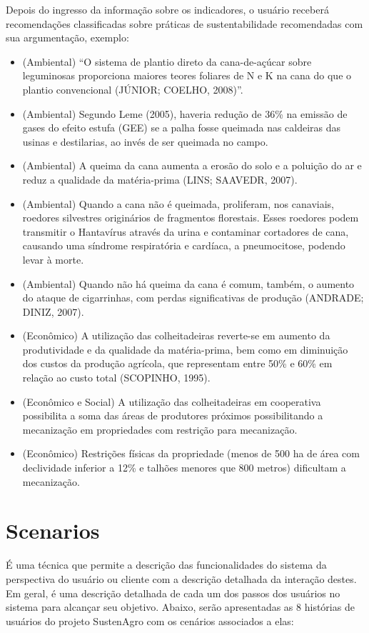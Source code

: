 Depois do ingresso da informação sobre os indicadores, o usuário receberá
recomendações classificadas sobre práticas de sustentabilidade recomendadas
com sua argumentação, exemplo: 
\begin{itemize}
\item (Ambiental) “O sistema de plantio direto da cana-de-açúcar sobre leguminosas
proporciona maiores teores foliares de N e K na cana do que o plantio
convencional (JÚNIOR; COELHO, 2008)”.
\item (Ambiental) Segundo Leme (2005), haveria redução de 36\% na emissão
de gases do efeito estufa (GEE) se a palha fosse queimada nas caldeiras
das usinas e destilarias, ao invés de ser queimada no campo.
\item (Ambiental) A queima da cana aumenta a erosão do solo e a poluição
do ar e reduz a qualidade da matéria-prima (LINS; SAAVEDR, 2007). 
\item (Ambiental) Quando a cana não é queimada, proliferam, nos canaviais,
roedores silvestres originários de fragmentos florestais. Esses roedores
podem transmitir o Hantavírus através da urina e contaminar cortadores
de cana, causando uma síndrome respiratória e cardíaca, a pneumocitose,
podendo levar à morte. 
\item (Ambiental) Quando não há queima da cana é comum, também, o aumento
do ataque de cigarrinhas, com perdas significativas de produção (ANDRADE;
DINIZ, 2007). 
\item (Econômico) A utilização das colheitadeiras reverte-se em aumento
da produtividade e da qualidade da matéria-prima, bem como em diminuição
dos custos da produção agrícola, que representam entre 50\% e 60\%
em relação ao custo total (SCOPINHO, 1995).
\item (Econômico e Social) A utilização das colheitadeiras em cooperativa
possibilita a soma das áreas de produtores próximos possibilitando
a mecanização em propriedades com restrição para mecanização.
\item (Econômico) Restrições físicas da propriedade (menos de 500 ha de
área com declividade inferior a 12\% e talhões menores que 800 metros)
dificultam a mecanização. 
\end{itemize}

\section{Scenarios}

É uma técnica que permite a descrição das funcionalidades do sistema
da perspectiva do usuário ou cliente com a descrição detalhada da
interação destes. Em geral, é uma descrição detalhada de cada um dos
passos dos usuários no sistema para alcançar seu objetivo. Abaixo,
serão apresentadas as 8 histórias de usuários do projeto SustenAgro
com os cenários associados a elas:

